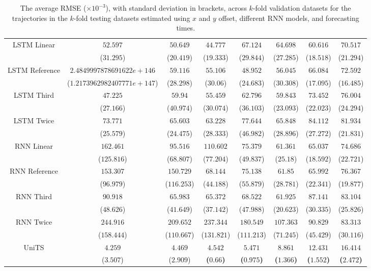 \begin{table}[!ht]
{\begin{tabular}{|c|c|c|c|c|c|c|c|}
			\multirow{2}{*}{LSTM Linear} & $52.597$ & $50.649$ & $44.777$ & $67.124$ & $64.698$ & $60.616$ & $70.517$ \\
			 & ($31.295$) & ($20.419$) & ($19.333$) & ($29.844$) & ($27.285$) & ($18.518$) & ($21.294$) \\ \hline
			\multirow{2}{*}{LSTM Reference} & $2.4849997878691622e+146$ & $59.116$ & $55.106$ & $48.952$ & $56.045$ & $66.084$ & $72.592$ \\
			 & ($1.2173962982407771e+147$) & ($28.298$) & ($30.06$) & ($24.683$) & ($30.308$) & ($17.095$) & ($16.485$) \\ \hline
			\multirow{2}{*}{LSTM Third} & $47.225$ & $59.94$ & $55.459$ & $62.796$ & $59.843$ & $73.452$ & $76.004$ \\
			 & ($27.166$) & ($40.974$) & ($30.074$) & ($36.103$) & ($23.093$) & ($22.023$) & ($24.294$) \\ \hline
			\multirow{2}{*}{LSTM Twice} & $73.771$ & $65.603$ & $63.228$ & $77.644$ & $65.848$ & $84.112$ & $81.934$ \\
			 & ($25.579$) & ($24.475$) & ($28.333$) & ($46.982$) & ($28.896$) & ($27.272$) & ($21.831$) \\ \hline
			\multirow{2}{*}{RNN Linear} & $162.461$ & $95.516$ & $110.602$ & $75.379$ & $61.361$ & $65.037$ & $74.686$ \\
			 & ($125.816$) & ($68.807$) & ($77.204$) & ($49.837$) & ($25.18$) & ($18.592$) & ($22.721$) \\ \hline
			\multirow{2}{*}{RNN Reference} & $153.307$ & $150.729$ & $68.144$ & $75.138$ & $61.85$ & $65.992$ & $76.367$ \\
			 & ($96.979$) & ($116.253$) & ($44.188$) & ($55.879$) & ($28.781$) & ($22.341$) & ($19.877$) \\ \hline
			\multirow{2}{*}{RNN Third} & $90.918$ & $65.983$ & $65.372$ & $68.522$ & $61.925$ & $87.141$ & $83.104$ \\
			 & ($48.626$) & ($41.649$) & ($37.142$) & ($47.988$) & ($20.623$) & ($30.335$) & ($25.826$) \\ \hline
			\multirow{2}{*}{RNN Twice} & $244.916$ & $209.652$ & $237.344$ & $180.549$ & $107.363$ & $90.829$ & $83.313$ \\
			 & ($158.444$) & ($110.667$) & ($131.821$) & ($111.213$) & ($71.245$) & ($45.429$) & ($30.116$) \\ \hline
			\multirow{2}{*}{UniTS} & $4.259$ & $4.469$ & $\mathbf{4.542}$ & $\mathbf{5.471}$ & $\mathbf{8.861}$ & $\mathbf{12.431}$ & $\mathbf{16.414}$ \\
			 & ($3.507$) & ($2.909$) & \textbf{(}$\mathbf{0.66}$\textbf{)} & \textbf{(}$\mathbf{0.975}$\textbf{)} & \textbf{(}$\mathbf{1.366}$\textbf{)} & \textbf{(}$\mathbf{1.552}$\textbf{)} & \textbf{(}$\mathbf{2.472}$\textbf{)} \\ \hline
		\end{tabular}
	}
	\caption{The average RMSE ($\times 10^{-3}$), with standard deviation in brackets, across $k$-fold validation datasets for the trajectories in the $k$-fold testing datasets estimated using $x$ and $y$ offset, different RNN models, and forecasting times.}
	\label{tab:all_no_abs_RMSE}
\end{table}

